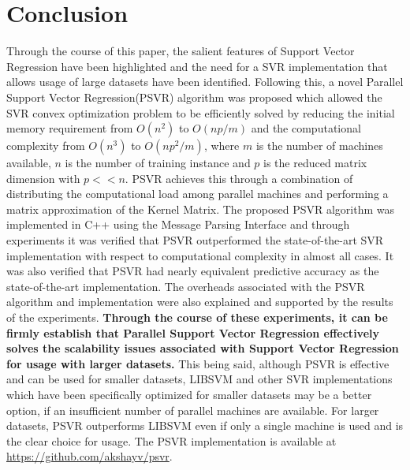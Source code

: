 \documentclass[12pt]{article}
\begin{document}
\section{Conclusion}
Through the course of this paper, the salient features of Support Vector Regression have been highlighted and the need for a SVR implementation that allows usage of large datasets have been identified. Following this, a novel Parallel Support Vector Regression(PSVR) algorithm was proposed which  allowed the SVR convex optimization problem to be efficiently solved by reducing the initial memory requirement from $O(n^2)$ to $O(np/m)$ and the computational complexity from $O(n^3)$ to $O(np^2/m)$,  where $m$ is the number of machines available, $n$ is the number of training instance and $p$ is the reduced matrix dimension with $p << n$. PSVR  achieves this through a combination of distributing the computational load among parallel machines and performing a matrix approximation of the Kernel Matrix.
\newline\newline
The proposed PSVR algorithm was implemented in C++ using the Message Parsing Interface and through experiments it was verified that PSVR outperformed the state-of-the-art SVR implementation with respect to computational complexity in almost all cases. It was also verified that PSVR had nearly equivalent predictive accuracy as the state-of-the-art implementation. The overheads associated with the PSVR algorithm and implementation were also explained and supported by the results of the experiments. 
\newline
\newline
{\bf Through the course of these experiments, it can be firmly establish that Parallel Support Vector Regression effectively solves the scalability issues associated with Support Vector Regression for usage with larger datasets.}
\newline
\newline
This being said, although PSVR is effective and can be used for smaller datasets, LIBSVM and other SVR implementations which have been specifically optimized for smaller datasets may be a better option, if an insufficient number of parallel machines are available. For larger datasets, PSVR outperforms LIBSVM even if only a single machine is used and is the clear choice for usage.
\newline\newline
The PSVR implementation is available at \url{https://github.com/akshayv/psvr}. 
\end{document}
